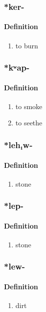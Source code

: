\subsubsection{\**ker-}
\paragraph{Definition}
\begin{enumerate}
\item to burn
\end{enumerate}
\subsubsection{\**kʷap-}
\paragraph{Definition}
\begin{enumerate}
\item to smoke
\item to seethe
\end{enumerate}
\subsubsection{\**leh₁w-}
\paragraph{Definition}
\begin{enumerate}
\item stone
\end{enumerate}
\subsubsection{\**lep-}
\paragraph{Definition}
\begin{enumerate}
\item stone
\end{enumerate}
\subsubsection{\**lew-}
\paragraph{Definition}
\begin{enumerate}
\item dirt
\end{enumerate}
